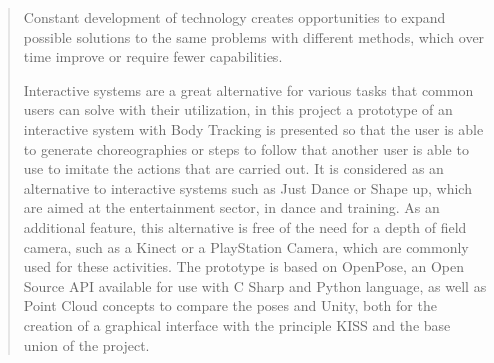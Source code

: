 \begin{quotation}
	\noindent Constant development of technology creates opportunities to expand possible solutions to the same problems with different methods, which over time improve or require fewer capabilities.
	
	Interactive systems are a great alternative for various tasks that common users can solve with their utilization, in this project a prototype of an interactive system with Body Tracking is presented so that the user is able to generate choreographies or steps to follow that another user is able to use to imitate the actions that are carried out. It is considered as an alternative to interactive systems such as Just Dance or Shape up, which are aimed at the entertainment sector, in dance and training. As an additional feature, this alternative is free of the need for a depth of field camera, such as a Kinect or a PlayStation Camera, which are commonly used for these activities.
	The prototype is based on OpenPose, an Open Source API available for use with C Sharp and Python language, as well as Point Cloud concepts to compare the poses and Unity, both for the creation of a graphical interface with the principle KISS and the base union of the project.
\end{quotation}
\clearpage
